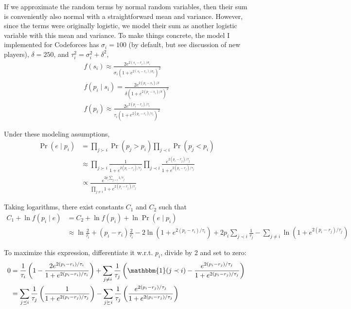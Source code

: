 \documentclass{article}
\begin{document}
If we approximate the random terms by normal random variables, then their sum is conveniently also normal with a straightforward mean and variance. However, since the terms were originally logistic, we model their sum as another logistic variable with this mean and variance. To make things concrete, the model I implemented for Codeforces has $\sigma_i = 100$ (by default, but see discussion of new players), $\delta = 250$, and $\tau_i^2 = \sigma_i^2 + \delta^2$,
\begin{align}
f(s_i) \approx \frac { 2e^{2(s_i-r_i)/\sigma_i} } { \sigma_i\left(1 + e^{2(s_i-r_i)/\sigma_i} \right)^2 }
\\f(p_i\mid s_i) = \frac { 2e^{2(p_i-s_i)/\delta} } { \delta\left(1 + e^{2(p_i-s_i)/\delta} \right)^2}
\\f(p_i) \approx \frac { 2e^{2(p_i-r_i)/\tau_i} } { \tau_i\left(1 + e^{2(p_i-r_i)/\tau_i} \right)^2}
\end{align}

Under these modeling assumptions,
\begin{align}
\Pr(e\mid p_i) &= \prod_{j \succ i} \Pr(p_j > p_i) \prod_{j \prec i} \Pr(p_j < p_i)
\\&\approx \prod_{j \succ i} \frac {1} {1 + e^{2(p_i-r_j)/\tau_j}} \prod_{j \prec i} \frac {e^{2(p_i-r_j)/\tau_j}} {1 + e^{2(p_i-r_j)/\tau_j}}
\\&\propto \frac {e^{2p_i\sum_{j\prec i}1/\tau_j}} {\prod_{j\neq i} 1 + e^{2(p_i-r_j)/\tau_j}}
\end{align}

Taking logarithms, there exist constants $C_1$ and $C_2$ such that
\begin{align}
C_1 + \ln f(p_i\mid e) &= C_2 + \ln f(p_i) + \ln \Pr(e\mid p_i)
\\&\approx \ln \frac{2}{\tau_i} + (p_i-r_i)\frac{2}{\tau_i} - 2\ln\left(1 + e^{2(p_i-r_i)/\tau_i} \right) + 2p_i\sum_{j\prec i} \frac{1}{\tau_j} - \sum_{j\neq i} \ln\left(1 + e^{2(p_i-r_j)/\tau_j}\right)
\end{align}

To maximize this expression, differentiate it w.r.t. $p_i$, divide by 2 and set to zero:
\begin{align}
0 &= \frac{1}{\tau_i}\left(1 - \frac {2e^{2(p_i-r_i)/\tau_i}} {1 + e^{2(p_i-r_i)/\tau_i}} \right) + \sum_{j\neq i}\frac{1}{\tau_j}\left(\mathbbm{1}(j\prec i) - \frac {e^{2(p_i-r_j)/\tau_j}} {1 + e^{2(p_i-r_j)/\tau_j}} \right)
\\&= \sum_{j\preceq i}\frac{1}{\tau_j}\left(\frac {1} {1 + e^{2(p_i-r_j)/\tau_j}} \right)
	- \sum_{j\succeq i}\frac{1}{\tau_j}\left(\frac {e^{2(p_i-r_j)/\tau_j}} {1 + e^{2(p_i-r_j)/\tau_j}} \right)
\end{align}
\end{document}
